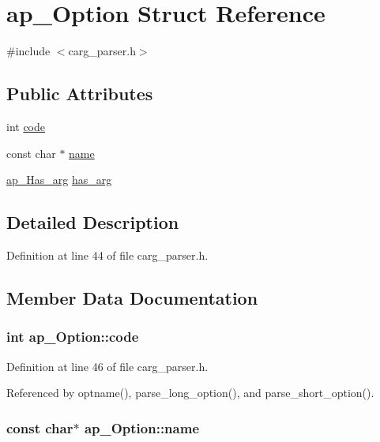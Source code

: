 \hypertarget{structap__Option}{
\section{ap\_\-Option Struct Reference}
\label{d1/d64/structap__Option}
}


{\ttfamily \#include $<$carg\_\-parser.h$>$}

\subsection*{Public Attributes}
\begin{DoxyCompactItemize}
\item 
int \hyperlink{structap__Option_a29bdaaa4e38ee62ada49097046196cda}{code}
\item 
const char $\ast$ \hyperlink{structap__Option_a3caa8c99e9396ca1bda123086f973549}{name}
\item 
\hyperlink{carg__parser_8h_a25cb436ba7a57cdaebe5e6ff174acf27}{ap\_\-Has\_\-arg} \hyperlink{structap__Option_ae03ec6e8ecabc2ac71c229cb995d2b2f}{has\_\-arg}
\end{DoxyCompactItemize}


\subsection{Detailed Description}


Definition at line 44 of file carg\_\-parser.h.



\subsection{Member Data Documentation}
\hypertarget{structap__Option_a29bdaaa4e38ee62ada49097046196cda}{
\subsubsection[{code}]{\setlength{\rightskip}{0pt plus 5cm}int {\bf ap\_\-Option::code}}}
\label{d1/d64/structap__Option_a29bdaaa4e38ee62ada49097046196cda}


Definition at line 46 of file carg\_\-parser.h.



Referenced by optname(), parse\_\-long\_\-option(), and parse\_\-short\_\-option().

\hypertarget{structap__Option_a3caa8c99e9396ca1bda123086f973549}{
\subsubsection[{name}]{\setlength{\rightskip}{0pt plus 5cm}const char$\ast$ {\bf ap\_\-Option::name}}}
\label{d1/d64/structap__Option_a3caa8c99e9396ca1bda123086f973549}


